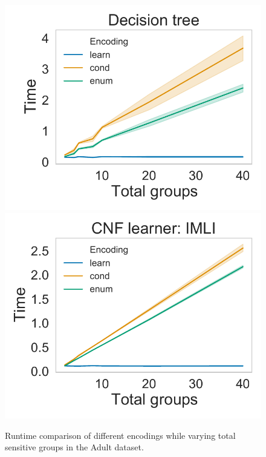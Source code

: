 \begin{figure}[t!]
	\begin{center}
		\includegraphics[scale=.4]{figures/fairness/justicia/encoding_runtime_Adult_DT.pdf}
		\includegraphics[scale=.4]{figures/fairness/justicia/encoding_runtime_Adult_IMLI.pdf}
		\hfill
		\caption{Runtime comparison of different encodings while varying total sensitive groups in the Adult dataset. }
		\label{fairness_justicia_fig:runtime_diff_encodings}
	\end{center}
\end{figure}



